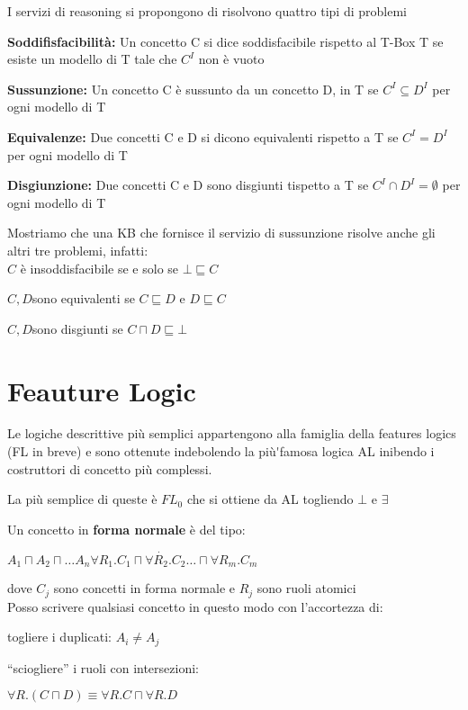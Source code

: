 I servizi di reasoning si propongono di risolvono quattro tipi di
problemi

\textbf{Soddifisfacibilità: }Un concetto C si dice soddisfacibile
rispetto al T-Box T se esiste un modello di T tale che $C^{I}$ non
è vuoto

\textbf{Sussunzione: }Un concetto C è sussunto da un concetto D, in
T se $C^{I}\subseteq D^{I}$ per ogni modello di T

\textbf{Equivalenze: }Due concetti C e D si dicono equivalenti rispetto
a T se $C^{I}=D^{I}$per ogni modello di T

\textbf{Disgiunzione: }Due concetti C e D sono disgiunti tispetto
a T se $C^{I}\cap D^{I}=\emptyset$ per ogni modello di T

Mostriamo che una KB che fornisce il servizio di sussunzione risolve
anche gli altri tre problemi, infatti:\\


$C$ è insoddisfacibile se e solo se $\bot\sqsubseteq C$ 

$C,D$sono equivalenti se $C\sqsubseteq D$ e $D\sqsubseteq C$

$C,D$sono disgiunti se $C\sqcap D\sqsubseteq\bot$


\section{Feauture Logic}

Le logiche descrittive più semplici appartengono alla famiglia della
features logics (FL in breve) e sono ottenute indebolendo la più\'{ }famosa
logica AL inibendo i costruttori di concetto più complessi.

La più semplice di queste è $FL_{0}$ che si ottiene da AL togliendo
$\bot$ e $\exists$

Un concetto in \textbf{forma normale }è del tipo:

$A_{1}\sqcap A_{2}\sqcap\dot{\dots A_{n}\forall R_{1}.C_{1}\sqcap\forall R_{2}.C_{2}\dots\sqcap\forall R_{m}.C_{m}}$

dove $C_{j}$ sono concetti in forma normale e $R_{j}$ sono ruoli
atomici\\


Posso scrivere qualsiasi concetto in questo modo con l'accortezza
di:

togliere i duplicati: $A_{i}\neq A_{j}$

``sciogliere'' i ruoli con intersezioni: 

$\forall R.(C\sqcap D)\equiv\forall R.C\sqcap\forall R.D$

